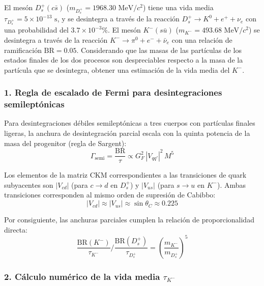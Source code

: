 \begin{problema}
El mesón $D_s^+(c\bar{s})$ ($m_{D_s^+} = 1968.30\text{ MeV}/c^2$) tiene una vida media $\tau_{D_s^+} = 5 \times 10^{-13}\text{ s}$, y se desintegra a través de la reacción $D_s^+ \rightarrow K^0 + e^+ + \nu_e$ con una probabilidad del $3.7 \times 10^{-3}\%$. El mesón $K^-(s\bar{u})$ ($m_{K^-} = 493.68\text{ MeV}/c^2$) se desintegra a través de la reacción $K^- \rightarrow \pi^0 + e^- + \bar{\nu}_e$ con una relación de ramificación $\text{BR} = 0.05$. Considerando que las masas de las partículas de los estados finales de los dos procesos son despreciables respecto a la masa de la partícula que se desintegra, obtener una estimación de la vida media del $K^-$.

\tcblower

\subsubsection*{1. Regla de escalado de Fermi para desintegraciones semileptónicas}

Para desintegraciones débiles semileptónicas a tres cuerpos con partículas finales ligeras, la anchura de desintegración parcial escala con la quinta potencia de la masa del progenitor (regla de Sargent):
\begin{equation*}
\Gamma_{\text{semi}} = \frac{\text{BR}}{\tau} \propto G_F^2 \, |V_{qq'}|^2 \, M^5
\end{equation*}

Los elementos de la matriz CKM correspondientes a las transiciones de quark subyacentes son $|V_{cd}|$ (para $c \to d$ en $D_s^+$) y $|V_{us}|$ (para $s \to u$ en $K^-$). Ambas transiciones corresponden al mismo orden de supresión de Cabibbo:
\begin{equation*}
|V_{cd}| \approx |V_{us}| \approx \sin\theta_C \approx 0.225
\end{equation*}

Por consiguiente, las anchuras parciales cumplen la relación de proporcionalidad directa:
\begin{equation*}
\frac{\text{BR}(K^-)}{\tau_{K^-}} \Big/ \frac{\text{BR}(D_s^+)}{\tau_{D_s^+}} = \left( \frac{m_{K^-}}{m_{D_s^+}} \right)^5
\end{equation*}

\subsubsection*{2. Cálculo numérico de la vida media $\tau_{K^-}$}


\end{problema}
